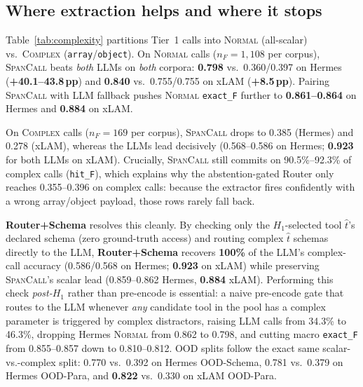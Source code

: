 \subsection{Where extraction helps and where it stops}
\label{sec:results:complexity}
Table~\ref{tab:complexity} partitions Tier~1 calls into \textsc{Normal} (all-scalar) vs.\ \textsc{Complex} (\texttt{array}/\texttt{object}). On \textsc{Normal} calls ($n_F{=}1{,}108$ per corpus), \textsc{SpanCall} beats \emph{both} LLMs on \emph{both} corpora: \textbf{0.798} vs.\ 0.360/0.397 on Hermes (\textbf{+40.1--43.8\,pp}) and \textbf{0.840} vs.\ 0.755/0.755 on xLAM (\textbf{+8.5\,pp}). Pairing \textsc{SpanCall} with LLM fallback pushes \textsc{Normal} \texttt{exact\_F} further to \textbf{0.861--0.864} on Hermes and \textbf{0.884} on xLAM.

On \textsc{Complex} calls ($n_F{=}169$ per corpus), \textsc{SpanCall} drops to 0.385 (Hermes) and 0.278 (xLAM), whereas the LLMs lead decisively (0.568--0.586 on Hermes; \textbf{0.923} for both LLMs on xLAM). Crucially, \textsc{SpanCall} still commits on 90.5\%--92.3\% of complex calls (\texttt{hit\_F}), which explains why the abstention-gated Router only reaches 0.355--0.396 on complex calls: because the extractor fires confidently with a wrong array/object payload, those rows rarely fall back.

\textbf{Router+Schema} resolves this cleanly. By checking only the $H_1$-selected tool $\hat{t}$'s declared schema (zero ground-truth access) and routing complex $\hat{t}$ schemas directly to the LLM, \textbf{Router+Schema} recovers \textbf{100\%} of the LLM's complex-call accuracy (0.586/0.568 on Hermes; \textbf{0.923} on xLAM) while preserving \textsc{SpanCall}'s scalar lead (0.859--0.862 Hermes, \textbf{0.884} xLAM). Performing this check \emph{post-$H_1$} rather than pre-encode is essential: a naive pre-encode gate that routes to the LLM whenever \emph{any} candidate tool in the pool has a complex parameter is triggered by complex distractors, raising LLM calls from 34.3\% to 46.3\%, dropping Hermes \textsc{Normal} from 0.862 to 0.798, and cutting macro \texttt{exact\_F} from 0.855--0.857 down to 0.810--0.812. OOD splits follow the exact same scalar-vs.-complex split: 0.770 vs.\ 0.392 on Hermes OOD-Schema, 0.781 vs.\ 0.379 on Hermes OOD-Para, and \textbf{0.822} vs.\ 0.330 on xLAM OOD-Para.


